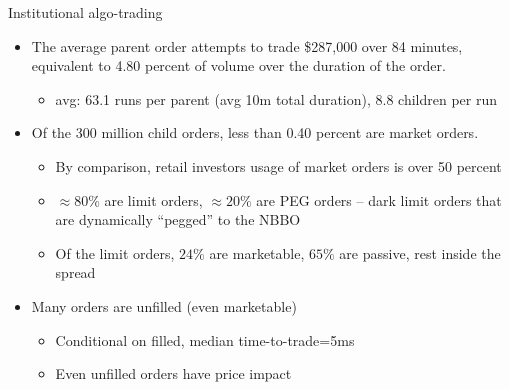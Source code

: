 \documentclass[english,10pt
,aspectratio=169
]{beamer}
\begin{document}
\begin{frame}{Institutional algo-trading}
	\begin{itemize}
		\item The average parent order attempts to trade \$287,000 over 84
		minutes, equivalent to 4.80 percent of volume over the duration of the order.
		\pause[3]
		\begin{itemize}
			\item avg: 63.1 runs per parent (avg 10m total duration), 8.8 children per run
		\end{itemize}
		\pause[2]
		\pause[5]
		\item Of the 300 million child orders, less than 0.40 percent are market orders.
		\pause[6]
		\begin{itemize}
			\item By comparison, retail investors usage of market orders is over 50 percent
			\item $\approx 80\%$ are limit orders, $\approx 20\%$ are PEG orders -- dark limit orders that are dynamically “pegged” to the NBBO
			\item Of the limit orders, $24\%$ are marketable, $65\%$ are passive, rest inside the spread
		\end{itemize}
		\item Many orders are unfilled (even marketable)
		\begin{itemize}
			\item Conditional on filled, median time-to-trade=5ms
			\item Even unfilled orders have price impact
		\end{itemize}
	\end{itemize}
\end{frame}
\end{document}
